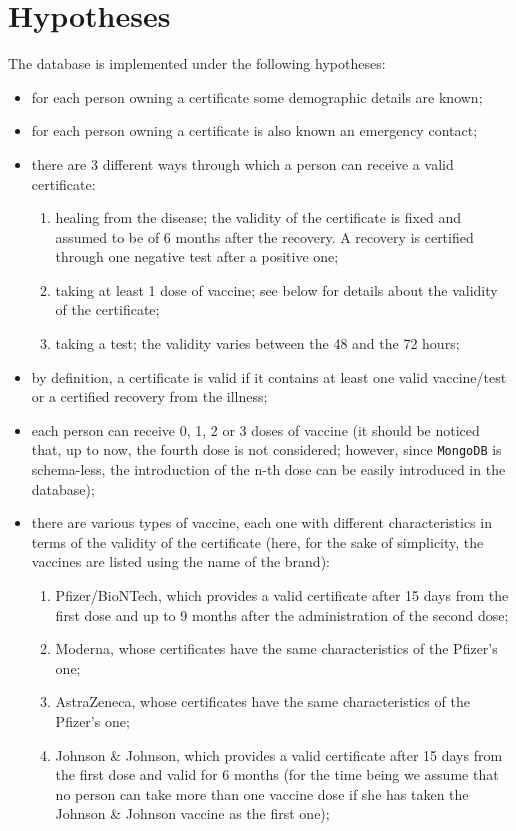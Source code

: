\documentclass{article}
\begin{document}
\section{Hypotheses} \label{hypotheses}
The database is implemented under the following hypotheses:
\begin{itemize}
    \item for each person owning a certificate some demographic details are known;
    \item for each person owning a certificate is also known an emergency contact;
    \item there are 3 different ways through which a person can receive a valid certificate:
    \begin{enumerate}
        \item healing from the disease; the validity of the certificate is fixed and assumed to be of 6 months after the recovery. A recovery is certified through one negative test after a positive one;
        \item taking at least 1 dose of vaccine; see below for details about the validity of the certificate;
        \item taking a test; the validity varies between the 48 and the 72 hours;
    \end{enumerate}
    \item by definition, a certificate is valid if it contains at least one valid vaccine/test or a certified recovery from the illness;
    \item each person can receive 0, 1, 2 or 3 doses of vaccine (it should be noticed that, up to now, the fourth dose is not considered; however, since \verb|MongoDB| is schema-less, the introduction of the n-th dose can be easily introduced in the database);
\item there are various types of vaccine, each one with different characteristics in terms of the validity of the certificate (here, for the sake of simplicity, the vaccines are listed using the name of the brand):
\begin{enumerate}
    \item Pfizer/BioNTech, which provides a valid certificate after 15 days from the first dose and up to 9 months after the administration of the second dose;
    \item Moderna, whose certificates have the same characteristics of the Pfizer's one;
    \item AstraZeneca, whose certificates have the same characteristics of the Pfizer's one;
    \item Johnson \& Johnson, which provides a valid certificate after 15 days from the first dose and valid for 6 months (for the time being we assume that no person can take more than one vaccine dose if she has taken the Johnson \& Johnson vaccine as the first one);

\end{enumerate}
\end{itemize}
\end{document}
